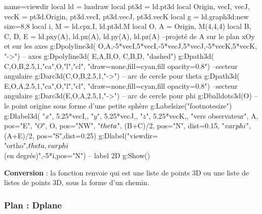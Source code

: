 \begin{Luacode}
\begin{luadraw}{name=viewdir}
local ld = luadraw
local pt3d = ld.pt3d
local Origin, vecI, vecJ, vecK = pt3d.Origin, pt3d.vecI, pt3d.vecJ, pt3d.vecK 
local g = ld.graph3d:new{ size={8,8} }
local i, M = ld.cpx.I, ld.pt3d.M
local O, A = Origin, M(4,4,4)
local B, C, D, E = ld.pxy(A), ld.px(A), ld.py(A), ld.pz(A) --projeté de A sur le plan xOy et sur les axes
g:Dpolyline3d( {{O,A},{-5*vecI,5*vecI},{-5*vecJ,5*vecJ},{-5*vecK,5*vecK}}, "->") -- axes
g:Dpolyline3d( {{E,A,B,O}, {C,B,D}}, "dashed")
g:Dpath3d( {C,O,B,2.5,1,"ca",O,"l","cl"}, "draw=none,fill=cyan,fill opacity=0.8") --secteur angulaire
g:Darc3d(C,O,B,2.5,1,"->") -- arc de cercle pour theta
g:Dpath3d( {E,O,A,2.5,1,"ca",O,"l","cl"}, "draw=none,fill=cyan,fill opacity=0.8") --secteur angulaire
g:Darc3d(E,O,A,2.5,1,"->") -- arc de cercle pour phi
g:Dballdots3d(O) -- le point origine sous forme d'une petite sphère
g:Labelsize("footnotesize")
g:Dlabel3d(
  "$x$", 5.25*vecI,{}, "$y$", 5.25*vecJ,{}, "$z$", 5.25*vecK,{},
  "vers observateur", A, {pos="E"},
  "$O$", O, {pos="NW"},
  "$\\theta$", (B+C)/2, {pos="N", dist=0.15},
  "$\\varphi$", (A+E)/2, {pos="S",dist=0.25})
g:Dlabel("viewdir=\\{"ortho",$\\theta,\\varphi$\\} (en degrés)",-5*i,{pos="N"}) -- label 2D
g:Show()
\end{luadraw}
\end{Luacode}

\textbf{Conversion} : la fonction  renvoie  qui est une liste de points 3D ou une liste de listes de points 3D, sous la forme d'un chemin.

\subsubsection{Plan : Dplane}

